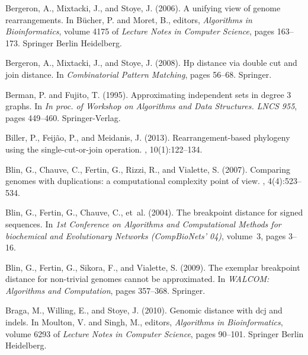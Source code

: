 \documentclass[11pt,final,twoside,nofrench]{thlifl}
\begin{document}
{\begin{thebibliography}{}
Bergeron, A., Mixtacki, J., and Stoye, J. (2006).
\newblock A unifying view of genome rearrangements.
\newblock In Bücher, P. and Moret, B., editors, {\em Algorithms in
  Bioinformatics}, volume 4175 of {\em Lecture Notes in Computer Science},
  pages 163--173. Springer Berlin Heidelberg.

Bergeron, A., Mixtacki, J., and Stoye, J. (2008).
\newblock Hp distance via double cut and join distance.
\newblock In {\em Combinatorial Pattern Matching}, pages 56--68. Springer.

Berman, P. and Fujito, T. (1995).
\newblock Approximating independent sets in degree 3 graphs.
\newblock In {\em In proc. of Workshop on Algorithms and Data Structures. LNCS
  955}, pages 449--460. Springer-Verlag.

Biller, P., Feij{\~a}o, P., and Meidanis, J. (2013).
\newblock Rearrangement-based phylogeny using the single-cut-or-join operation.
, 10(1):122--134.

Blin, G., Chauve, C., Fertin, G., Rizzi, R., and Vialette, S. (2007).
\newblock Comparing genomes with duplications: a computational complexity point
  of view.
, 4(4):523--534.

Blin, G., Fertin, G., Chauve, C., et~al. (2004).
\newblock The breakpoint distance for signed sequences.
\newblock In {\em 1st Conference on Algorithms and Computational Methods for
  biochemical and Evolutionary Networks (CompBioNets' 04)}, volume~3, pages
  3--16.

Blin, G., Fertin, G., Sikora, F., and Vialette, S. (2009).
\newblock The exemplar breakpoint distance for non-trivial genomes cannot be
  approximated.
\newblock In {\em WALCOM: Algorithms and Computation}, pages 357--368.
  Springer.

Braga, M., Willing, E., and Stoye, J. (2010).
\newblock Genomic distance with dcj and indels.
\newblock In Moulton, V. and Singh, M., editors, {\em Algorithms in
  Bioinformatics}, volume 6293 of {\em Lecture Notes in Computer Science},
  pages 90--101. Springer Berlin Heidelberg.


\end{thebibliography}}
\end{document}

